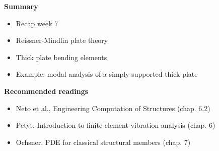 \documentclass[aspectratio=169]{beamer}
\begin{document}
{  \begin{frame}
    \textbf{\large Summary}
    \begin{itemize}
      \item Recap week 7
      \item Reissner-Mindlin plate theory
      \item Thick plate bending elements
      \item Example: modal analysis of a simply supported thick plate
    \end{itemize}
    \vspace{.5cm}

    \textbf{\large Recommended readings}
    \begin{itemize}
      \item[(N)] Neto et al., Engineering Computation of Structures (chap. 6.2)
      \item[(P)] Petyt, Introduction to finite element vibration analysis (chap. 6)
      \item[(O)] Ochsner, PDE for classical structural members (chap. 7)
    \end{itemize}
  \end{frame}
}
\end{document}
